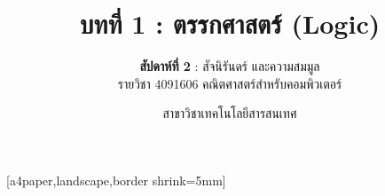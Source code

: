 \def\HANDOUTMODE{}

\usepackage{pgfpages}
[a4paper,landscape,border shrink=5mm]
\renewcommand{\footchaptertitle}{บทที่ 1 ตรรกศาสตร์ (สัปดาห์ที่ 2) — Handout}

\title{\textbf{บทที่ 1 : ตรรกศาสตร์ (Logic)}}
\subtitle{\textbf{สัปดาห์ที่ 2} : สัจนิรันดร์ และความสมมูล \\ รายวิชา 4091606 คณิตศาสตร์สำหรับคอมพิวเตอร์}
\author{สาขาวิชาเทคโนโลยีสารสนเทศ}
\date{}




